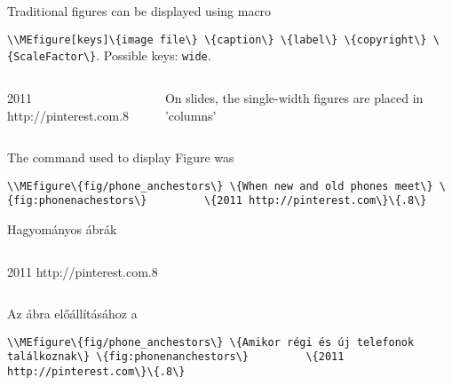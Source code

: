 



{
Traditional figures can be displayed using macro
\par\noindent\lstinline|\\MEfigure[keys]\{image file\} \{caption\} \{label\} \{copyright\} \{ScaleFactor\}|.
Possible keys: \lstinline|wide|.


\begin{columns}
		{2011 http://pinterest.com}{.8}

On slides, the single-width figures are placed in 'columns'
\end{columns}

\par\noindent The command used to display Figure\ao{~\ref{fig:phonenanchestors}} was
\par\noindent\lstinline|\\MEfigure\{fig/phone_anchestors\} \{When new and old phones meet\} \{fig:phonenachestors\}
		\{2011 http://pinterest.com\}\{.8\}|

}
{Hagyományos ábrák}
{
\begin{columns}
		{2011 http://pinterest.com}{.8}
\end{columns}
\par\noindent Az \ao{~\ref{fig:phonenanchestors}} ábra előállításához a
\par\noindent\lstinline|\\MEfigure\{fig/phone_anchestors\} \{Amikor régi és új telefonok találkoznak\} \{fig:phonenanchestors\}
		\{2011 http://pinterest.com\}\{.8\}|
}

